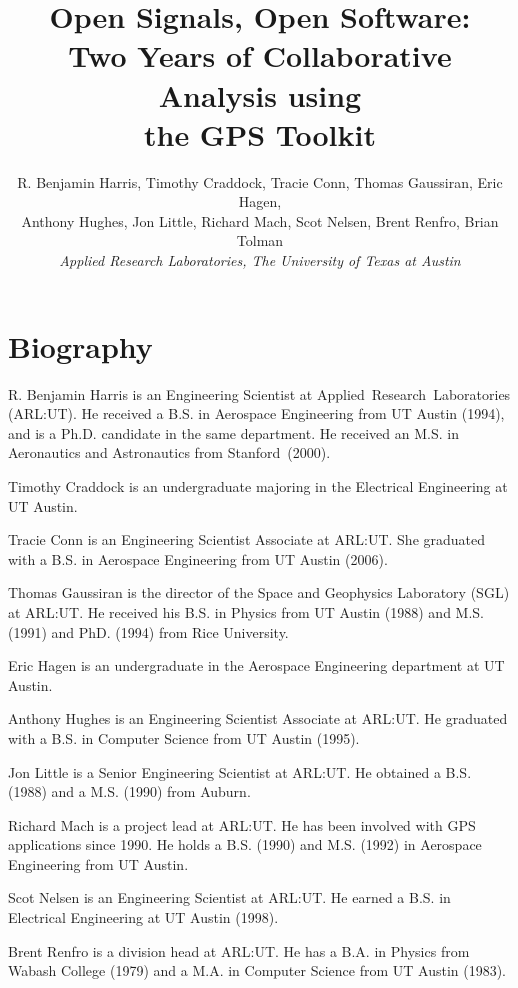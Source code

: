\documentclass{ion-gps}
\title{\huge\bf Open Signals, Open Software:\\
                Two Years of Collaborative Analysis using \\
                the GPS Toolkit }
\author{R. Benjamin Harris, Timothy Craddock, Tracie Conn, Thomas Gaussiran, 
        Eric Hagen, \\
        Anthony Hughes, Jon Little, Richard Mach, Scot Nelsen, 
        Brent Renfro, Brian Tolman\\ 
        \it{Applied Research Laboratories, The University of Texas at Austin}}
\date{}
\begin{document}
\def\figurename{Fig.}
\def\tablename{Table}

\pagestyle{plain} %

\maketitle

\thispagestyle{empty} %

\section*{Biography}

R. Benjamin Harris is an Engineering Scientist at \mbox{Applied Research
Laboratories} (ARL:UT). He received a B.S. in Aerospace Engineering from UT Austin (1994), and is a Ph.D. candidate in the same department. He received an M.S. in Aeronautics and Astronautics from \mbox{Stanford (2000)}.

Timothy Craddock is an undergraduate majoring in the Electrical
Engineering at UT Austin.

Tracie Conn is an Engineering Scientist Associate at ARL:UT. She
graduated with a B.S. in Aerospace Engineering from UT Austin (2006).

Thomas Gaussiran is the director of the Space and Geophysics Laboratory
(SGL) at ARL:UT. He received his B.S. in Physics from UT Austin (1988)
and M.S. (1991) and PhD. (1994) from Rice University.

Eric Hagen is an undergraduate in the Aerospace Engineering department
at UT Austin.

Anthony Hughes is an Engineering Scientist Associate at ARL:UT. He
graduated with a B.S. in Computer Science from UT Austin (1995).

Jon Little is a Senior Engineering Scientist at ARL:UT. He obtained a
B.S. (1988) and a M.S. (1990) from Auburn.

Richard Mach is a project lead at ARL:UT.  He has been involved with
GPS applications since 1990.  He holds a B.S. (1990) and M.S. (1992) in Aerospace
Engineering from UT Austin.

Scot Nelsen is an Engineering Scientist at ARL:UT. He earned a B.S. in
Electrical Engineering at UT Austin (1998).

Brent Renfro is a division head at ARL:UT. He has a B.A. in Physics
from Wabash College (1979) and a M.A. in Computer Science from UT
Austin (1983).
\end{document}
